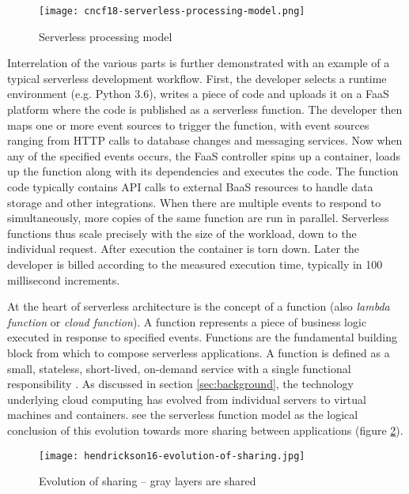 \begin{figure}[h]
  \centering
  \texttt{[image: cncf18-serverless-processing-model.png]}
  \caption{Serverless processing model \parencite{cncf18serverlessWG}}
  \label{fig:processingModel}
\end{figure}

Interrelation of the various parts is further demonstrated with an example of a typical serverless development workflow. First, the developer selects a runtime environment (e.g. Python 3.6), writes a piece of code and uploads it on a FaaS platform where the code is published as a serverless function. The developer then maps one or more event sources to trigger the function, with event sources ranging from HTTP calls to database changes and messaging services. Now when any of the specified events occurs, the FaaS controller spins up a container, loads up the function along with its dependencies and executes the code. The function code typically contains API calls to external BaaS resources to handle data storage and other integrations. When there are multiple events to respond to simultaneously, more copies of the same function are run in parallel. Serverless functions thus scale precisely with the size of the workload, down to the individual request. After execution the container is torn down. Later the developer is billed according to the measured execution time, typically in 100 millisecond increments. \parencite{awslambda0218}

At the heart of serverless architecture is the concept of a function (also \textit{lambda function} or \textit{cloud function}). A function represents a piece of business logic executed in response to specified events. Functions are the fundamental building block from which to compose serverless applications. A function is defined as a small, stateless, short-lived, on-demand service with a single functional responsibility \parencite{van2017spec}. As discussed in section \ref{sec:background}, the technology underlying cloud computing has evolved from individual servers to virtual machines and containers. \textcite{hendrickson16openlambda} see the serverless function model as the logical conclusion of this evolution towards more sharing between applications (figure \ref{fig:evolutionOfSharing}).

\begin{figure}[h]
  \centering
  \texttt{[image: hendrickson16-evolution-of-sharing.jpg]}
  \caption{Evolution of sharing -- gray layers are shared \parencite{hendrickson16openlambda}}
  \label{fig:evolutionOfSharing}
\end{figure}

